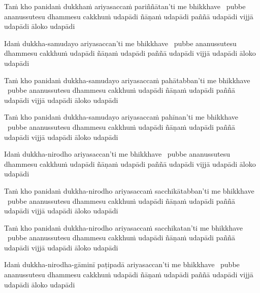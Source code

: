 \begin{pali-hang}
  Taṁ kho panidaṁ dukkhaṁ ariyasaccaṁ pariññātan'ti me bhikkhave \breathmark\ pubbe ananussutesu dhammesu cakkhuṁ udapādi ñāṇaṁ udapādi paññā udapādi vijjā udapādi āloko udapādi
\end{pali-hang}

\begin{pali-hang}
  Idaṁ dukkha-samudayo ariyasaccan'ti me bhikkhave \breathmark\ pubbe ananussutesu dhammesu cakkhuṁ udapādi ñāṇaṁ udapādi paññā udapādi vijjā udapādi āloko udapādi
\end{pali-hang}

\begin{pali-hang}
  Taṁ kho panidaṁ dukkha-samudayo ariyasaccaṁ pahātabban'ti me bhikkhave \breathmark\ pubbe ananussutesu dhammesu cakkhuṁ udapādi ñāṇaṁ udapādi paññā udapādi vijjā udapādi āloko udapādi
\end{pali-hang}

\begin{pali-hang}
  Taṁ kho panidaṁ dukkha-samudayo ariyasaccaṁ pahīnan'ti me bhikkhave \breathmark\ pubbe ananussutesu dhammesu cakkhuṁ udapādi ñāṇaṁ udapādi paññā udapādi vijjā udapādi āloko udapādi
\end{pali-hang}

\begin{pali-hang}
  Idaṁ dukkha-nirodho ariyasaccan'ti me bhikkhave \breathmark\ pubbe ananussutesu dhammesu cakkhuṁ udapādi ñāṇaṁ udapādi paññā udapādi vijjā udapādi āloko udapādi
\end{pali-hang}

\begin{pali-hang}
  Taṁ kho panidaṁ dukkha-nirodho ariyasaccaṁ sacchikātabban'ti me bhikkhave \breathmark\ pubbe ananussutesu dhammesu cakkhuṁ udapādi ñāṇaṁ udapādi paññā udapādi vijjā udapādi āloko udapādi
\end{pali-hang}

\begin{pali-hang}
  Taṁ kho panidaṁ dukkha-nirodho ariyasaccaṁ sacchikatan'ti me bhikkhave \breathmark\ pubbe ananussutesu dhammesu cakkhuṁ udapādi ñāṇaṁ udapādi paññā udapādi vijjā udapādi āloko udapādi
\end{pali-hang}

\begin{pali-hang}
  Idaṁ dukkha-nirodha-gāminī paṭipadā ariyasaccan'ti me bhikkhave \breathmark\ pubbe ananussutesu dhammesu cakkhuṁ udapādi ñāṇaṁ udapādi paññā udapādi vijjā udapādi āloko udapādi
\end{pali-hang}

